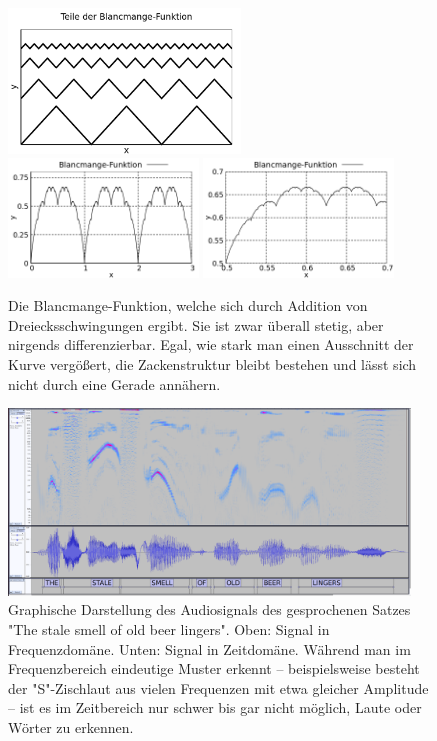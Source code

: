 \begin{figure}[H]
    \centering
    \includegraphics[width=0.55\textwidth]{./gnuplot/blancmange-function-parts}
    \includegraphics[width=0.45\textwidth]{./gnuplot/blancmange-function-total}
    \includegraphics[width=0.45\textwidth]{./gnuplot/blancmange-function-zoomed}
    \caption{Die Blancmange-Funktion, welche sich durch Addition von Dreiecksschwingungen ergibt. Sie ist zwar überall stetig, aber nirgends differenzierbar. Egal, wie stark man einen Ausschnitt der Kurve vergößert, die Zackenstruktur bleibt bestehen und lässt sich nicht durch eine Gerade annähern.}
    \label{fig:BlancmangeFunction}
\end{figure}

\begin{figure}[H]
    \centering
    \includegraphics[width=0.95\textwidth]{./img/speech-recognition}
    \caption{Graphische Darstellung des Audiosignals des gesprochenen Satzes "The stale smell of old beer lingers". Oben: Signal in Frequenzdomäne. Unten: Signal in Zeitdomäne. Während man im Frequenzbereich eindeutige Muster erkennt -- beispielsweise besteht der "S"-Zischlaut aus vielen Frequenzen mit etwa gleicher Amplitude -- ist es im Zeitbereich nur schwer bis gar nicht möglich, Laute oder Wörter zu erkennen.}
    \label{fig:SpeechFreq}
\end{figure}

